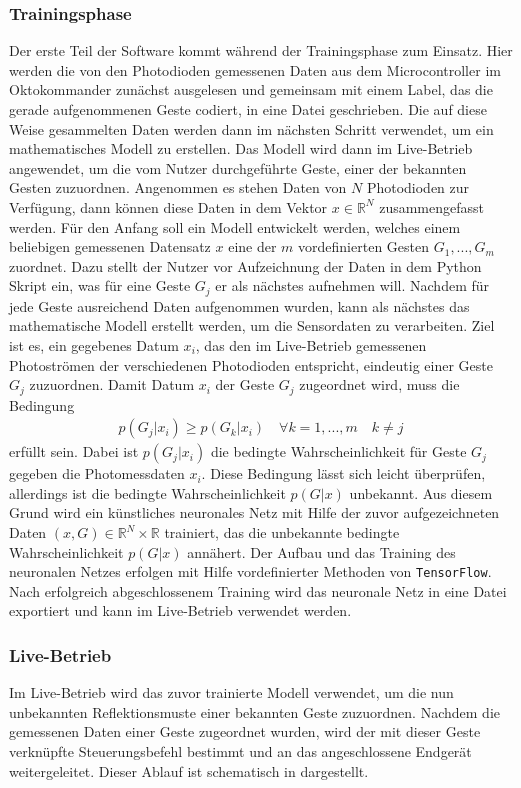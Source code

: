 \subsubsection*{Trainingsphase}
Der erste Teil der Software kommt während der Trainingsphase zum Einsatz. Hier werden die von den Photodioden gemessenen Daten aus dem Microcontroller im Oktokommander zunächst ausgelesen und gemeinsam mit einem Label, das die gerade aufgenommenen Geste codiert, in eine Datei geschrieben. Die auf diese Weise gesammelten Daten werden dann im nächsten Schritt verwendet, um ein mathematisches Modell zu erstellen. Das Modell wird dann im Live-Betrieb angewendet, um die vom Nutzer durchgeführte Geste, einer der bekannten Gesten zuzuordnen. Angenommen es stehen Daten von $N$ Photodioden zur Verfügung, dann können diese Daten in dem Vektor $x\in \mathbb{R}^N$ zusammengefasst werden. Für den Anfang soll ein Modell entwickelt werden, welches einem beliebigen gemessenen Datensatz $x$ eine der $m$ vordefinierten Gesten $G_1 , ... , G_m$ zuordnet. Dazu stellt der Nutzer vor Aufzeichnung der Daten in dem Python Skript ein, was für eine Geste $G_j$ er als nächstes aufnehmen will. Nachdem für jede Geste ausreichend Daten aufgenommen wurden, kann als nächstes das mathematische Modell erstellt werden, um die Sensordaten zu verarbeiten. Ziel ist es, ein gegebenes Datum $x_i$, das den im Live-Betrieb gemessenen Photoströmen der verschiedenen Photodioden entspricht, eindeutig einer Geste $G_j$ zuzuordnen. Damit Datum $x_i$ der Geste $G_j$ zugeordnet wird, muss die Bedingung 
\begin{align*}
	p(G_j | x_i) \geq p(G_k | x_i) \quad \forall k = 1,...,m \quad k \neq j
\end{align*}
erfüllt sein. Dabei ist $p(G_j | x_i)$ die bedingte Wahrscheinlichkeit für Geste $G_j$ gegeben die Photomessdaten $x_i$. Diese Bedingung lässt sich leicht überprüfen, allerdings ist die bedingte Wahrscheinlichkeit $p(G | x)$ unbekannt. Aus diesem Grund wird ein künstliches neuronales Netz mit Hilfe der zuvor aufgezeichneten Daten $(x,G) \in \mathbb{R}^N \times \mathbb{R}$ trainiert, das die unbekannte bedingte Wahrscheinlichkeit $p(G | x)$ annähert. Der Aufbau und das Training des neuronalen Netzes erfolgen mit Hilfe vordefinierter Methoden von \texttt{TensorFlow}\texttrademark. Nach erfolgreich abgeschlossenem Training wird das neuronale Netz in eine Datei exportiert und kann im Live-Betrieb verwendet werden.

\subsubsection*{Live-Betrieb}
Im Live-Betrieb wird das zuvor trainierte Modell verwendet, um die nun unbekannten Reflektionsmuste einer bekannten Geste zuzuordnen. Nachdem die gemessenen Daten einer Geste zugeordnet wurden, wird der mit dieser Geste verknüpfte Steuerungsbefehl bestimmt und an das angeschlossene Endgerät weitergeleitet. Dieser Ablauf ist schematisch in  dargestellt.

